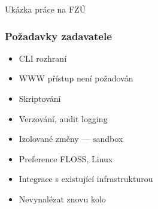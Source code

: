 \documentclass{beamer}
\begin{document}
\begin{frame}[fragile]
\begin{center}
Ukázka práce na FZÚ
\end{center}
\end{frame}


\begin{frame}[fragile]
\frametitle{Požadavky zadavatele}
\begin{itemize}
    \item CLI rozhraní
    \item WWW přístup není požadován
    \item Skriptování
    \item Verzování, audit logging
    \item Izolované změny --- sandbox
    \item Preference FLOSS, Linux
    \item Integrace s existující infrastrukturou
    \item Nevynalézat znovu kolo
\end{itemize}
\end{frame}
\end{document}
